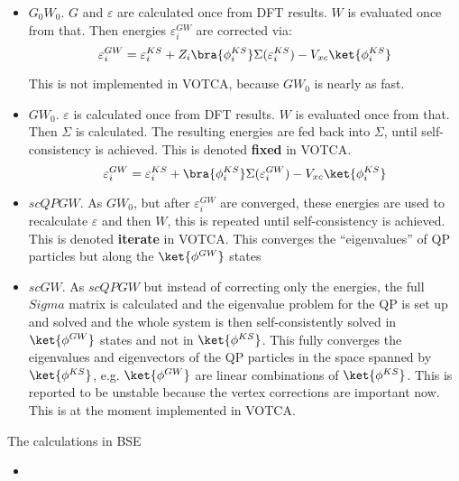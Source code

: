 \begin{itemize}
 \item $G_0W_0$. $G$ and $\varepsilon$ are calculated once from DFT results. $W$ is evaluated once from that. Then energies $ \varepsilon_i^{GW}$ are corrected via:
 \begin{equation}
   \varepsilon_i^{GW}=\varepsilon_i^{KS}+Z_i\bra{\phi^{KS}_i} \Sigma(\varepsilon_i^{KS})-V_{xc} \ket{\phi^{KS}_i}
 \end{equation}
 
 This is not implemented in VOTCA, because $GW_0$ is nearly as fast. 
 
 \item $GW_0$. $\varepsilon$ is calculated once from DFT results. $W$ is evaluated once from that. Then $\Sigma$ is calculated. The resulting energies are fed back into $\Sigma$, until self-consistency is achieved. This is denoted \textbf{fixed} in VOTCA.
 \begin{equation}
   \varepsilon_i^{GW}=\varepsilon_i^{KS}+\bra{\phi^{KS}_i} \Sigma(\varepsilon_i^{GW})-V_{xc} \ket{\phi^{KS}_i}
 \end{equation} 
 
 
 \item $scQPGW$. As $GW_0$, but after $\varepsilon_i^{GW}$ are converged, these energies are used to recalculate  $\varepsilon$ and then $W$, this is repeated until self-consistency is achieved. This is denoted \textbf{iterate} in VOTCA. This converges the ``eigenvalues'' of QP particles but along the $\ket{\phi^{GW}}$ states
 
 \item $scGW$. As $scQPGW$ but instead of correcting only the energies, the full $Sigma$ matrix is calculated and the eigenvalue problem for the QP is set up and solved and the whole system is then self-consistently solved in $\ket{\phi^{GW}}$ states and not in   $\ket{\phi^{KS}}$. This fully converges the eigenvalues and eigenvectors of the QP particles in the space spanned by $\ket{\phi^{KS}}$, e.g. $\ket{\phi^{GW}}$ are linear combinations of $\ket{\phi^{KS}}$. This is reported to be unstable because the vertex corrections are important now. This is at the moment implemented in VOTCA.
 

\end{itemize}

The calculations in BSE

\begin{itemize}
 \item 
\end{itemize}


